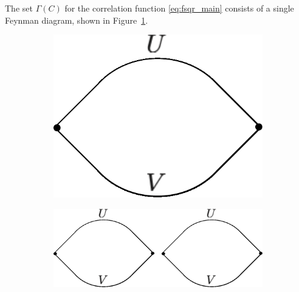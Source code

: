 \documentclass[english]{article}
\begin{document}
The set $\Gamma(C)$ for the correlation function \eqref{eq:fsqr_main} consists of a single Feynman diagram, shown in Figure~\ref{fig:f_sqr_1hl_0}.
\begin{figure}
    \centering
    \begin{subfigure}[b]{0.15\textwidth}
      \includegraphics[width=\textwidth]{new_figs/f_2_1hl}
      \caption{}
      \label{fig:f_sqr_1hl_0}
    \end{subfigure}
\quad \quad \quad \quad 
    \begin{subfigure}[b]{0.30\textwidth}
        \includegraphics[width=\textwidth]{new_figs/f_4_1hla}
        \caption{}
        \label{fig:f_4_1hla}
    \end{subfigure}
\quad \quad \quad \quad 
    \begin{subfigure}[b]{0.15\textwidth}

\end{subfigure}
\end{figure}
\end{document}
